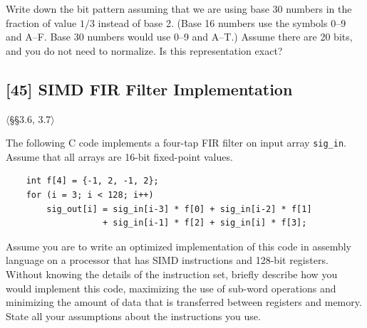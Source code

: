 \noindent Write down the bit pattern assuming that we are using base 30
numbers in the fraction of value $1/3$ instead of base 2. (Base 16 numbers
use the symbols 0--9 and A--F. Base 30 numbers would use 0--9 and A--T.)
Assume there are 20 bits, and you do not need to normalize. Is this
representation exact?

\problembreak

\subsection{[45] SIMD FIR Filter Implementation}
\hypertarget{prob-3.47}{}
\noindent$\langle$\S\S3.6, 3.7$\rangle$\medskip

\noindent The following C code implements a four-tap FIR filter on input array
\texttt{sig\_in}. Assume that all arrays are 16-bit fixed-point values.

\begin{verbatim}
    int f[4] = {-1, 2, -1, 2};
    for (i = 3; i < 128; i++)
        sig_out[i] = sig_in[i-3] * f[0] + sig_in[i-2] * f[1]
                   + sig_in[i-1] * f[2] + sig_in[i] * f[3];
\end{verbatim}

\noindent Assume you are to write an optimized implementation of this code in
assembly language on a processor that has SIMD instructions and 128-bit
registers. Without knowing the details of the instruction set, briefly
describe how you would implement this code, maximizing the use of sub-word
operations and minimizing the amount of data that is transferred between
registers and memory. State all your assumptions about the instructions you
use.

